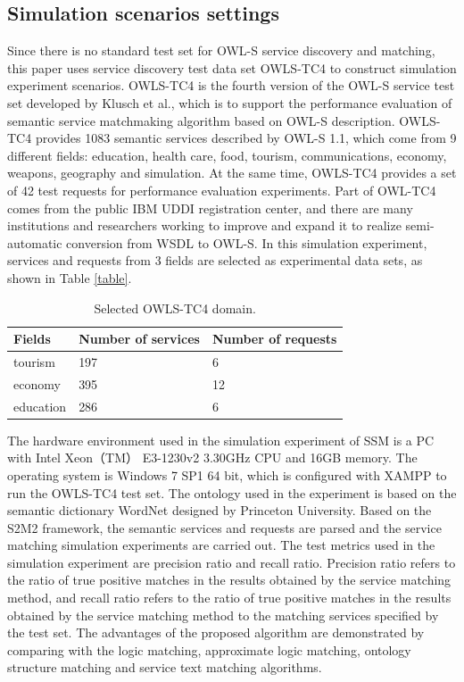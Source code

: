 \documentclass{ieeeaccess}
\begin{document}
\subsection{Simulation scenarios settings}
Since there is no standard test set for OWL-S service discovery and matching, this paper uses service discovery test data set OWLS-TC4 to construct simulation experiment scenarios. OWLS-TC4\cite{klusch2012isem} is the fourth version of the OWL-S service test set developed by Klusch et al., which is to support the performance evaluation of semantic service matchmaking algorithm based on OWL-S description. OWLS-TC4 provides 1083 semantic services described by OWL-S 1.1, which come from 9 different fields: education, health care, food, tourism, communications, economy, weapons, geography and simulation. At the same time, OWLS-TC4 provides a set of 42 test requests for performance evaluation experiments. Part of OWL-TC4 comes from the public IBM UDDI registration center, and there are many institutions and researchers working to improve and expand it to realize semi-automatic conversion from WSDL to OWL-S. In this simulation experiment, services and requests from 3 fields are selected as experimental data sets, as shown in Table \ref{table}.

\begin{table}
\caption{Selected OWLS-TC4 domain.}
\label{table}
\setlength{\tabcolsep}{3pt}
\begin{tabular}{p{75pt}|p{75pt}|p{75pt}}
\hline
Fields & Number of services & Number of requests\\
\hline
tourism & 197 & 6 \\
economy & 395 & 12 \\
education & 286 & 6 \\
\hline
\end{tabular}
\label{tab1}
\end{table}

The hardware environment used in the simulation experiment of SSM is a PC with Intel Xeon（TM） E3-1230v2 3.30GHz CPU and 16GB memory. The operating system is Windows 7 SP1 64 bit, which is configured with XAMPP to run the OWLS-TC4 test set. The ontology used in the experiment is based on the semantic dictionary WordNet designed by Princeton University. Based on the S2M2 framework, the semantic services and requests are parsed and the service matching simulation experiments are carried out.
The test metrics used in the simulation experiment are precision ratio and recall ratio. Precision ratio refers to the ratio of true positive matches in the results obtained by the service matching method, and recall ratio refers to the ratio of true positive matches in the results obtained by the service matching method to the matching services specified by the test set. The advantages of the proposed algorithm are demonstrated by comparing with the logic matching, approximate logic matching, ontology structure matching and service text matching algorithms.
\end{document}
